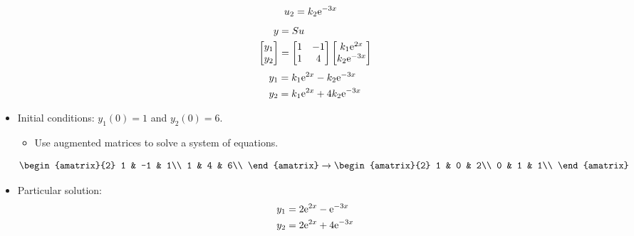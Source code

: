 \documentclass{article}
\begin{document}
\begin{itemize}
\begin{align*}
        u_2 &= k_2\text{e}^{-3x}
    \end{align*}
    \begin{align*}
        y &= Su\\
        \begin{bmatrix}
            y_1\\
            y_2\\
        \end{bmatrix}
        &=
        \begin{bmatrix}
            1 & -1\\
            1 & 4\\
        \end{bmatrix}
        \begin{bmatrix}
            k_1\text{e}^{2x}\\
            k_2\text{e}^{-3x}\\
        \end{bmatrix}
    \end{align*}
    \begin{align*}
        y_1 &= k_1\text{e}^{2x}-k_2\text{e}^{-3x}\\
        y_2 &= k_1\text{e}^{2x}+4k_2\text{e}^{-3x}
    \end{align*}
    \item {}Initial conditions: $y_1(0)=1$ and $y_2(0)=6$.
    \begin{itemize}
        \item Use augmented matrices to solve a system of equations.
    \end{itemize}
    \begin{equation*}
        \begin{amatrix}{2}
            1 & -1 & 1\\
            1 & 4 & 6\\
        \end{amatrix}
        \rightarrow
        \begin{amatrix}{2}
            1 & 0 & 2\\
            0 & 1 & 1\\
        \end{amatrix}
    \end{equation*}
    \item Particular solution:
    \begin{align*}
        y_1 &= 2\text{e}^{2x}-\text{e}^{-3x}\\
        y_2 &= 2\text{e}^{2x}+4\text{e}^{-3x}
    \end{align*}
\end{itemize}
\end{document}
